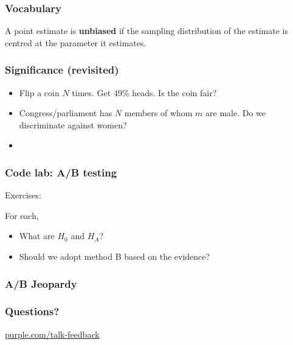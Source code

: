 \begin{frame}
  \frametitle{Vocabulary}

  A point estimate is \textbf{unbiased} if the sampling distribution
  of the estimate is centred at the parameter it estimates.


\end{frame}

\begin{frame}
  \frametitle{Significance (revisited)}

  \begin{itemize}
  \item Flip a coin $N$ times.  Get 49\% heads.  Is the coin fair?
  \item Congress/parliament has $N$ members of whom $m$ are male.  Do
    we discriminate against women?\\[5mm]
  \item {}
  \end{itemize}

  \cnote {
    
  }
  
\end{frame}

\begin{frame}
  \frametitle{Code lab: A/B testing}

  Exercises:

  For each,
  \begin{itemize}
  \item What are $H_0$ and $H_A$?
  \item Should we adopt method B based on the evidence?
  \end{itemize}

  \cnote {
    
  }
\end{frame}

\begin{frame}
  \frametitle{A/B Jeopardy}

\end{frame}

\begin{frame}
  \frametitle{Questions?}
  \vspace{3cm}
  \centerline{\large\url{purple.com/talk-feedback}}
\end{frame}



